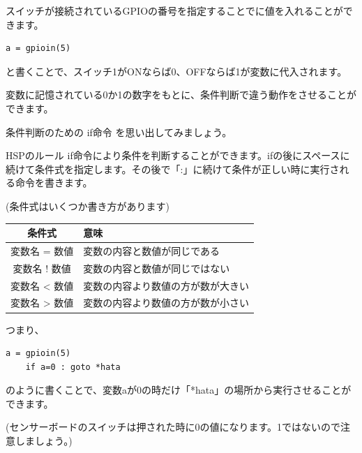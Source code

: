スイッチが接続されているGPIOの番号を指定することでに値を入れることができます。

\begin{lstlisting}[numbers=none]
    a = gpioin(5)
\end{lstlisting}

と書くことで、スイッチ1がONならば0、OFFならば1が変数に代入されます。

変数に記憶されている0か1の数字をもとに、条件判断で違う動作をさせることができます。

条件判断のための if命令 を思い出してみましょう。


\begin{itembox}[c]{HSPのルール}
    if命令により条件を判断することができます。ifの後にスペースに続けて条件式を指定します。その後で「:」に続けて条件が正しい時に実行される命令を書きます。
\end{itembox}

\begin{center}
    (条件式はいくつか書き方があります)
\end{center}
\begin{center}
    \begin{tabular}{cl} \hline
        条件式 & 意味 \\ \hline
        変数名 = 数値 & 変数の内容と数値が同じである \\
        変数名 ! 数値 & 変数の内容と数値が同じではない \\
        変数名 {\textless} 数値 & 変数の内容より数値の方が数が大きい \\
        変数名 {\textgreater} 数値 & 変数の内容より数値の方が数が小さい \\ \hline
    \end{tabular}
\end{center}

つまり、


\begin{lstlisting}[numbers=none]
    a = gpioin(5)
    if a=0 : goto *hata
\end{lstlisting}


のように書くことで、変数aが0の時だけ「*hata」の場所から実行させることができます。

(センサーボードのスイッチは押された時に0の値になります。1ではないので注意しましょう。)
